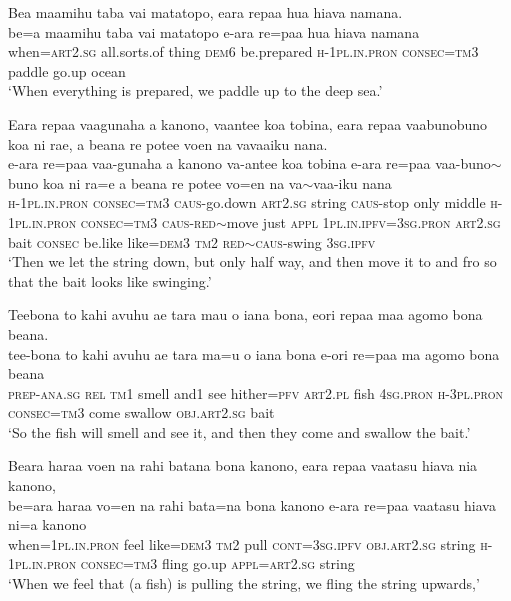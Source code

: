 \newpage
\ea\label{ex:text26-9}
Bea maamihu taba vai matatopo, eara repaa hua hiava namana.\\
\gll be=a	maamihu	taba	vai	matatopo	e-ara	re=paa	hua	hiava	namana\\
     when=\textsc{art}2.\textsc{sg}	all.sorts.of	thing	\textsc{dem}6	be.prepared	\textsc{h}-1\textsc{pl}.\textsc{in}.\textsc{pron}	\textsc{consec}=\textsc{tm}3	paddle	go.up	ocean\\
\glt `When everything is prepared, we paddle up to the deep sea.'
\z

\ea\label{ex:text26-10}
Eara repaa vaagunaha a kanono, vaantee koa tobina, eara repaa vaabunobuno koa ni rae, a beana re potee voen na vavaaiku nana.\\
\gll e-ara	re=paa	vaa-gunaha	a	kanono	va-antee	koa	tobina	e-ara	re=paa	vaa-buno{$\sim$}buno	koa	ni	ra=e	a	beana	re	potee	vo=en	na	va{$\sim$}vaa-iku	nana\\
     \textsc{h}-1\textsc{pl}.\textsc{in}.\textsc{pron}	\textsc{consec}=\textsc{tm}3	\textsc{caus}-go.down	\textsc{art}2.\textsc{sg}	string	\textsc{caus}-stop	only	middle	\textsc{h}-1\textsc{pl}.\textsc{in}.\textsc{pron}	\textsc{consec}=\textsc{tm}3	\textsc{caus}-\textsc{red}{$\sim$}move	just	\textsc{appl}	1\textsc{pl}.\textsc{in}.\textsc{ipfv}=3\textsc{sg}.\textsc{pron}	\textsc{art}2.\textsc{sg}	bait	\textsc{consec}	be.like	like=\textsc{dem}3	\textsc{tm}2	\textsc{red}{$\sim$}\textsc{caus}-swing	3\textsc{sg}.\textsc{ipfv}\\
\glt `Then we let the string down, but only half way, and then move it to and fro so that the bait looks like swinging.'
\z

\ea\label{ex:text26-11}
Teebona to kahi avuhu ae tara mau o iana bona, eori repaa maa agomo bona beana.\\
\gll tee-bona	to	kahi	avuhu	ae	tara	ma=u	o	iana	bona	e-ori	re=paa	ma	agomo	bona	beana\\
     \textsc{prep}-\textsc{ana}.\textsc{sg}	\textsc{rel}	\textsc{tm}1	smell	and1	see	hither=\textsc{pfv}	\textsc{art}2.\textsc{pl}	fish	4\textsc{sg}.\textsc{pron}	\textsc{h}-3\textsc{pl}.\textsc{pron}	\textsc{consec}=\textsc{tm}3	come	swallow	\textsc{obj}.\textsc{art}2.\textsc{sg}	bait\\
\glt `So the fish will smell and see it, and then they come and swallow the bait.'
\z

\ea\label{ex:text26-12}
Beara haraa voen na rahi batana bona kanono, eara repaa vaatasu hiava nia kanono,\\
\gll be=ara	haraa	vo=en	na	rahi	bata=na	bona	kanono	e-ara	re=paa	vaatasu	hiava	ni=a	kanono\\
     when=1\textsc{pl}.\textsc{in}.\textsc{pron}	feel	like=\textsc{dem}3	\textsc{tm}2	pull	\textsc{cont}=3\textsc{sg}.\textsc{ipfv}	\textsc{obj}.\textsc{art}2.\textsc{sg}	string	\textsc{h}-1\textsc{pl}.\textsc{in}.\textsc{pron}	\textsc{consec}=\textsc{tm}3	fling	go.up	\textsc{appl}=\textsc{art}2.\textsc{sg}	string\\
\glt `When we feel that (a fish) is pulling the string, we fling the string upwards,'
\z

